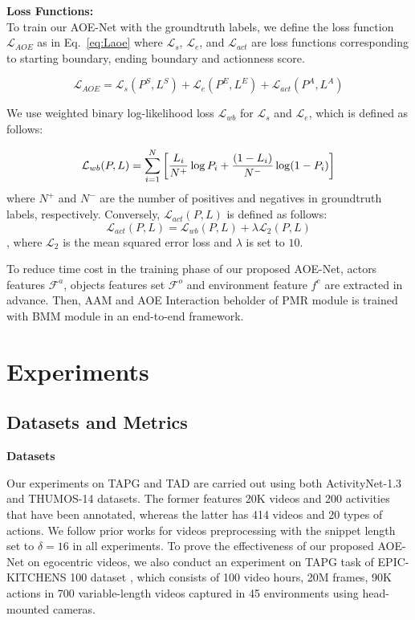\documentclass[sn-mathphys]{sn-jnl}
\theoremstyle{thmstyleone}\newtheorem{theorem}{Theorem}\newtheorem{proposition}[theorem]{Proposition}
\theoremstyle{thmstyletwo}\newtheorem{example}{Example}\newtheorem{remark}{Remark}
\theoremstyle{thmstylethree}\newtheorem{definition}{Definition}
\begin{document}
\vspace{2mm}
\noindent\textbf{Loss Functions:}\\
To train our AOE-Net with the groundtruth labels, we define the loss function $\mathcal{L}_{AOE}$ as in Eq.~\ref{eq:Laoe} where $\mathcal{L}_{s}$, $\mathcal{L}_{e}$, and $\mathcal{L}_{act}$ are loss functions corresponding to starting boundary, ending boundary and actionness score.

\begin{equation}
    \mathcal{L}_{AOE} = \mathcal{L}_{s}(P^S, L^S) + \mathcal{L}_{e}(P^E,L^E) + \mathcal{L}_{act}(P^A,L^A)
\label{eq:Laoe}
\end{equation}

We use weighted binary log-likelihood loss $\mathcal{L}_{wb}$ for $\mathcal{L}_{s}$ and $\mathcal{L}_{e}$, which is defined as follows:

\begin{equation}
\small
    \mathcal{L}_{wb}(P, L) =  \sum^{N}_{i=1}\left[\frac{L_i}{N^+}\log P_i + \frac{(1-L_i)}{N^-}\log (1-P_i)\right]
\label{eq:L_wb}
\end{equation}
\noindent
where $N^+$ and $N^-$ are the number of positives and negatives in groundtruth labels, respectively. Conversely, $\mathcal{L}_{act}(P,L)$ is defined as follows:
\begin{equation}
    \mathcal{L}_{act}(P,L)=\mathcal{L}_{wb}(P,L)+\lambda \mathcal{L}_2(P,L)
\end{equation}
, where $\mathcal{L}_2$ is the mean squared error loss and $\lambda$ is set to $10$.

To reduce time cost in the training phase of our proposed AOE-Net, actors features $\mathcal{F}^a$, objects features set $\mathcal{F}^o$ and environment feature $f^e$ are extracted in advance. Then, AAM and AOE Interaction beholder of PMR module is trained with BMM module in an end-to-end framework.

\section{Experiments}


\subsection{Datasets and Metrics}
\noindent
\textbf{Datasets}

\noindent
Our experiments on TAPG and TAD are carried out using both ActivityNet-1.3 \cite{caba2015activitynet} and THUMOS-14 \cite{THUMOS14} datasets. The former features 20K videos and 200 activities that have been annotated, whereas the latter has 414 videos and 20 types of actions. We follow prior works \cite{lin2018bsn,bmn, dbg} for videos preprocessing with the snippet length set to $\delta=16$ in all experiments. To prove the effectiveness of our proposed AOE-Net on egocentric videos, we also conduct an experiment on TAPG task of EPIC-KITCHENS 100 dataset \cite{damen2021rescaling}, which consists of 100 video hours, 20M frames, 90K actions in 700 variable-length videos captured in 45 environments using head-mounted cameras.
 
\end{document}
